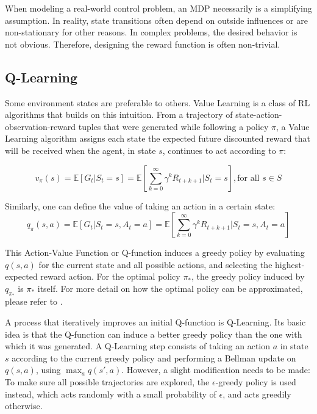 When modeling a real-world control problem, an MDP necessarily is a simplifying assumption.
In reality, state transitions often depend on outside influences or are non-stationary for other reasons.
In complex problems, the desired behavior is not obvious. Therefore, designing the reward function is often non-trivial.


\subsection{Q-Learning}
Some environment states are preferable to others.
Value Learning is a class of RL algorithms that builds on this intuition.
From a trajectory of state-action-observation-reward tuples that were generated while following a policy $\pi$, a Value Learning algorithm assigns each state the expected future discounted reward that will be received when the agent, in state $s$, continues to act according to $\pi$:

$$v_\pi(s) = \mathbb{E}[G_t | S_t=s] = \mathbb{E}[\sum_{k=0}^{\infty}\gamma^kR_{t+k+1} | S_t = s], \text{for all } s \in S$$

Similarly, one can define the value of taking an action in a certain state:
$$ q_\pi(s,a) = \mathbb{E}[G_t | S_t=s, A_t = a] = \mathbb{E}[\sum_{k=0}^{\infty}\gamma^kR_{t+k+1} | S_t = s, A_t = a]$$

This Action-Value Function or Q-function induces a greedy policy by evaluating $q(s,a)$ for the current state and all possible actions, and selecting the highest-expected reward action.
For the optimal policy $\pi_*$, the greedy policy induced by $q_{\pi_*}$ is $\pi_*$ itself.
For more detail on how the optimal policy can be approximated, please refer to \cite{sutton2018ReinforcementLearningIntroduction}.

A process that iteratively improves an initial Q-function is Q-Learning.
Its basic idea is that the Q-function can induce a better greedy policy than the one with which it was generated.
A Q-Learning step consists of taking an action $a$ in state $s$ according to the current greedy policy and performing a Bellman update on $q(s,a)$, using $\max_a{q(s',a)}$.
However, a slight modification needs to be made: To make sure all possible trajectories are explored, the $\epsilon$-greedy policy is used instead, which acts randomly with a small probability of $\epsilon$, and acts greedily otherwise.

